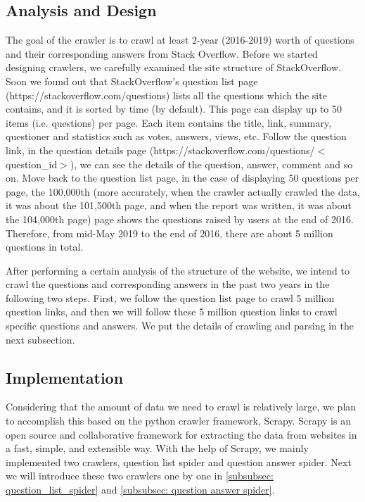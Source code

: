 \documentclass[10pt,journal,compsoc]{IEEEtran}
\begin{document}
\subsection{Analysis and Design}
\label{subsec:analysis_and_design}

The goal of the crawler is to crawl at least 2-year (2016-2019) worth of questions and their corresponding answers from Stack Overflow. Before we started designing crawlers, we carefully examined the site structure of StackOverflow. Soon we found out that StackOverflow's question list page (https://stackoverflow.com/questions) lists all the questions which the site contains, and it is sorted by time (by default). This page can display up to 50 items (i.e. questions) per page. Each item contains the title, link, summary, questioner and statistics such as votes, answers, views, etc. Follow the question link, in the question details page (https://stackoverflow.com/questions/$<$question\_id$>$), we can see the details of the question, answer, comment and so on. Move back to the question list page, in the case of displaying 50 questions per page, the 100,000th (more accurately, when the crawler actually crawled the data, it was about the 101,500th page, and when the report was written, it was about the 104,000th page) page shows the questions raised by users at the end of 2016. Therefore, from mid-May 2019 to the end of 2016, there are about 5 million questions in total.

After performing a certain analysis of the structure of the website, we intend to crawl the questions and corresponding answers in the past two years in the following two steps. First, we follow the question list page to crawl 5 million question links, and then we will follow these 5 million question links to crawl specific questions and answers. We put the details of crawling and parsing in the next subsection.

\subsection{Implementation}
\label{subsec:implementation}

Considering that the amount of data we need to crawl is relatively large, we plan to accomplish this based on the python crawler framework, Scrapy. Scrapy is an open source and collaborative framework for extracting the data from websites in a fast, simple, and extensible way. With the help of Scrapy, we mainly implemented two crawlers, question list spider and question answer spider. Next we will introduce these two crawlers one by one in \ref{subsubsec: question_list_spider} and \ref{subsubsec: question answer spider}.
\end{document}
